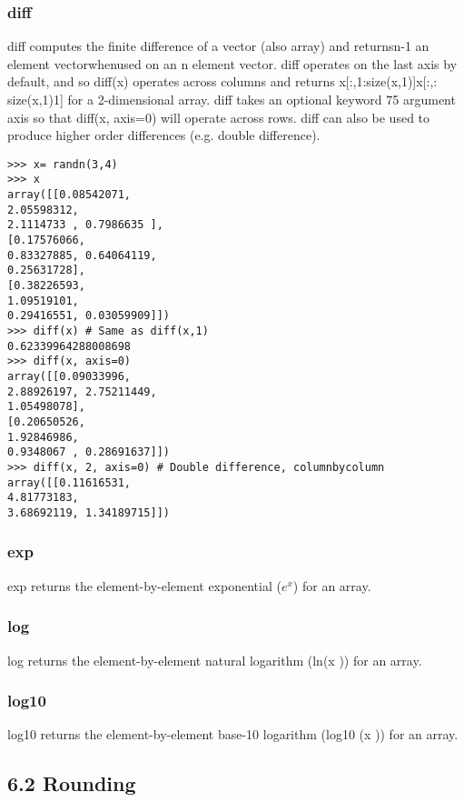 \documentclass[KSmain.tex]{subfiles}
\begin{document}
\subsubsection*{diff}
diff computes the finite difference of a vector (also array) and returnsn-1 an element vectorwhenused on
an n element vector. diff operates on the last axis by default, and so diff(x) operates across columns and
returns x[:,1:size(x,1)]x[:,:
size(x,1)1]
for a 2-dimensional array. diff takes an optional keyword
75
argument axis so that diff(x, axis=0) will operate across rows. diff can also be used to produce higher
order differences (e.g. double difference).
\begin{framed}
\begin{verbatim}>>> x= randn(3,4)
>>> x
array([[0.08542071,
2.05598312,
2.1114733 , 0.7986635 ],
[0.17576066,
0.83327885, 0.64064119,
0.25631728],
[0.38226593,
1.09519101,
0.29416551, 0.03059909]])
>>> diff(x) # Same as diff(x,1)
0.62339964288008698
>>> diff(x, axis=0)
array([[0.09033996,
2.88926197, 2.75211449,
1.05498078],
[0.20650526,
1.92846986,
0.9348067 , 0.28691637]])
>>> diff(x, 2, axis=0) # Double difference, columnbycolumn
array([[0.11616531,
4.81773183,
3.68692119, 1.34189715]])
\end{verbatim}
\end{framed}
\subsubsection*{exp}
exp returns the element-by-element exponential ($e^x$) for an array.
\subsubsection*{log}
log returns the element-by-element natural logarithm (ln(x )) for an array.
\subsubsection*{log10}
log10 returns the element-by-element base-10 logarithm (log10 (x )) for an array.

\subsection{6.2 Rounding}
\end{document}
